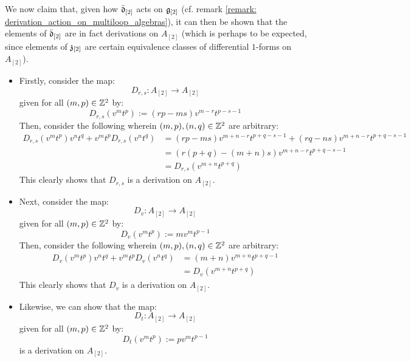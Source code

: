 \begin{remark}
                We now claim that, given how $\bar{\mathfrak{d}}_{[2]}$ acts on $\mathfrak{g}_{[2]}$ (cf. remark \ref{remark: derivation_action_on_multiloop_algebras}), it can then be shown that the elements of $\bar{\mathfrak{d}}_{[2]}$ are in fact derivations on $A_{[2]}$ (which is perhaps to be expected, since elements of $\mathfrak{z}_{[2]}$ are certain equivalence classes of differential $1$-forms on $A_{[2]}$).
                \begin{itemize}
                    \item Firstly, consider the map:
                        $$D_{r, s}: A_{[2]} \to A_{[2]}$$
                    given for all $(m, p) \in \mathbb{Z}^2$ by:
                        $$D_{r, s}(v^m t^p) := ( rp - ms ) v^{m - r} t^{p - s - 1}$$
                    Then, consider the following wherein $(m, p), (n, q) \in \mathbb{Z}^2$ are arbitrary:
                        $$
                            \begin{aligned}
                                D_{r, s}(v^m t^p) v^n t^q + v^m t^p D_{r, s}(v^n t^q) & = ( rp - ms ) v^{m + n - r} t^{p + q - s - 1} + ( rq - ns ) v^{m + n - r} t^{p + q - s - 1}
                                \\
                                & = ( r(p + q) - (m + n)s ) v^{m + n - r} t^{p + q - s - 1}
                                \\
                                & = D_{r, s}( v^{m + n} t^{p + q} )
                            \end{aligned}
                        $$
                    This clearly shows that $D_{r, s}$ is a derivation on $A_{[2]}$.
                    \item Next, consider the map:
                        $$D_v: A_{[2]} \to A_{[2]}$$
                    given for all $(m, p) \in \mathbb{Z}^2$ by:
                        $$D_v(v^m t^p) := m v^m t^{p - 1}$$
                    Then, consider the following wherein $(m, p), (n, q) \in \mathbb{Z}^2$ are arbitrary:
                        $$
                            \begin{aligned}
                                D_v(v^m t^p) v^n t^q + v^m t^p D_v(v^n t^q) & = (m + n) v^{m + n} t^{p + q - 1}
                                \\
                                & = D_v( v^{m + n} t^{p + q} )
                            \end{aligned}
                        $$
                    This clearly shows that $D_v$ is a derivation on $A_{[2]}$.
                    \item Likewise, we can show that the map:
                        $$D_t: A_{[2]} \to A_{[2]}$$
                    given for all $(m, p) \in \mathbb{Z}^2$ by:
                        $$D_t(v^m t^p) := p v^m t^{p - 1}$$
                    is a derivation on $A_{[2]}$.
                \end{itemize}


\end{remark}
